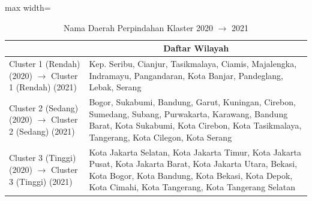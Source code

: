 \begin{table}[H]
\centering
\caption{Nama Daerah Perpindahan Klaster 2020 \(\rightarrow\) 2021} \label{tab:app2transname2020x2021}
\begin{adjustbox}{max width=\textwidth}
\begin{tabular}{|>{\centering\arraybackslash}p{4cm}|p{10cm}|}
\hline
\multicolumn{1}{|c|}{\textbf{Kategori}} & \multicolumn{1}{c|}{\textbf{Daftar Wilayah}} \\
\hline
Cluster 1 (Rendah) (2020) \(\rightarrow\) Cluster 1 (Rendah) (2021) & Kep. Seribu, Cianjur, Tasikmalaya, Ciamis, Majalengka, Indramayu, Pangandaran, Kota Banjar, Pandeglang, Lebak, Serang \\
\hline
Cluster 2 (Sedang) (2020) \(\rightarrow\) Cluster 2 (Sedang) (2021) & Bogor, Sukabumi, Bandung, Garut, Kuningan, Cirebon, Sumedang, Subang, Purwakarta, Karawang, Bandung Barat, Kota Sukabumi, Kota Cirebon, Kota Tasikmalaya, Tangerang, Kota Cilegon, Kota Serang \\
\hline
Cluster 3 (Tinggi) (2020) \(\rightarrow\) Cluster 3 (Tinggi) (2021) & Kota Jakarta Selatan, Kota Jakarta Timur, Kota Jakarta Pusat, Kota Jakarta Barat, Kota Jakarta Utara, Bekasi, Kota Bogor, Kota Bandung, Kota Bekasi, Kota Depok, Kota Cimahi, Kota Tangerang, Kota Tangerang Selatan \\
\hline
\end{tabular}
\end{adjustbox}
\end{table}